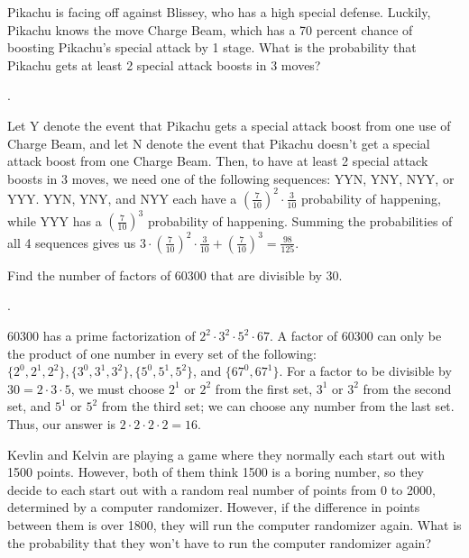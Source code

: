 \documentclass[11pt]{article}
\begin{document}
\begin{problem}
Pikachu is facing off against Blissey, who has a high special defense. Luckily, Pikachu knows the move Charge Beam, which has a 70 percent chance of boosting Pikachu's special attack by 1 stage. What is the probability that Pikachu gets at least 2 special attack boosts in 3 moves?
\end{problem}

\begin{answer}
.
\end{answer}

\begin{solution}
Let Y denote the event that Pikachu gets a special attack boost from one use of Charge Beam, and let N denote the event that Pikachu doesn't get a special attack boost from one Charge Beam. Then, to have at least 2 special attack boosts in 3 moves, we need one of the following sequences: YYN, YNY, NYY, or YYY. YYN, YNY, and NYY each have a $(\frac{7}{10})^2\cdot\frac{3}{10}$ probability of happening, while YYY has a $(\frac{7}{10})^3$ probability of happening. Summing the probabilities of all 4 sequences gives us $3\cdot(\frac{7}{10})^2\cdot\frac{3}{10} + (\frac{7}{10})^3 = \boxed{\frac{98}{125}}$.
\end{solution}

\begin{problem}
Find the number of factors of 60300 that are divisible by 30.
\end{problem}

\begin{answer}
.
\end{answer}

\begin{solution}
60300 has a prime factorization of $2^2\cdot3^2\cdot5^2\cdot67$. A factor of 60300 can only be the product of one number in every set of the following: $\{2^0, 2^1, 2^2\}, \{3^0, 3^1, 3^2\}, \{5^0, 5^1, 5^2\}$, and $\{67^0, 67^1\}$. For a factor to be divisible by $30 = 2\cdot3\cdot5$, we must choose $2^1$ or $2^2$ from the first set, $3^1$ or $3^2$ from the second set, and $5^1$ or $5^2$ from the third set; we can choose any number from the last set. Thus, our answer is $2\cdot2\cdot2\cdot2 = 16$.
\end{solution}

\begin{problem}
Kevlin and Kelvin are playing a game where they normally each start out with 1500 points. However, both of them think 1500 is a boring number, so they decide to each start out with a random real number of points from 0 to 2000, determined by a computer randomizer. However, if the difference in points between them is over 1800, they will run the computer randomizer again. What is the probability that they won't have to run the computer randomizer again? 
\end{problem}
\end{document}
